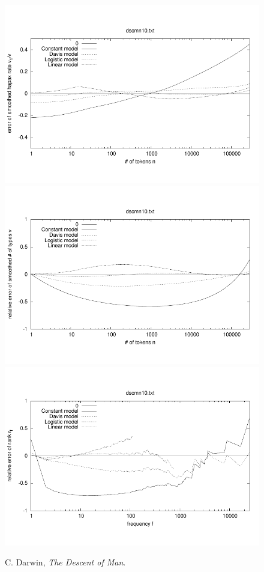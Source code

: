 \documentclass[a4paper,12pt]{article}
\begin{document}
\begin{figure}[p]
  \centering
  \vspace{-2em}
  \includegraphics[width=0.8\columnwidth]{output/herdan/dscmn10_27/token_ratio_residual.pdf}
  \\[-3em]
  \includegraphics[width=0.8\columnwidth]{output/herdan/dscmn10_27/token_residual.pdf}
  \\[-3em]
  \includegraphics[width=0.8\columnwidth]{output/herdan/dscmn10_27/frequency_residual.pdf}
  \vspace{-2em}
  \caption{C. Darwin, \emph{The Descent of Man}.\label{figdscmn10R}}
\end{figure}
\end{document}
